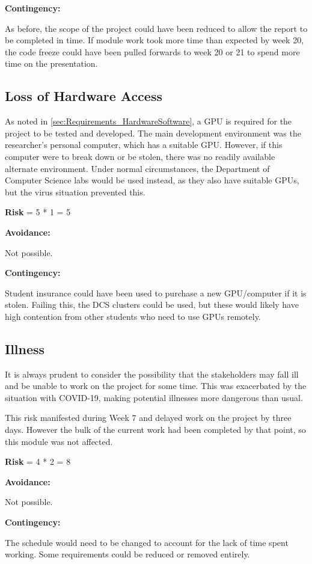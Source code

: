 \textbf{Contingency:}

\hspace{20pt}As before, the scope of the project could have been reduced to allow the report to be completed in time.
If module work took more time than expected by week 20, the code freeze could have been pulled forwards to week 20 or 21 to spend more time on the presentation.


\subsection{Loss of Hardware Access}
As noted in \cref{sec:Requirements_HardwareSoftware}, a GPU is required for the project to be tested and developed.
The main development environment was the researcher's personal computer, which has a suitable GPU.
However, if this computer were to break down or be stolen, there was no readily available alternate environment.
Under normal circumstances, the Department of Computer Science labs would be used instead, as they also have suitable GPUs, but the virus situation prevented this.

\textbf{Risk} = 5 * 1 = 5

\textbf{Avoidance:}

\hspace{20pt}Not possible.

\textbf{Contingency:}

\hspace{20pt}Student insurance could have been used to purchase a new GPU/computer if it is stolen.
Failing this, the DCS clusters could be used, but these would likely have high contention from other students who need to use GPUs remotely.

\subsection{Illness}
It is always prudent to consider the possibility that the stakeholders may fall ill and be unable to work on the project for some time.
This was exacerbated by the situation with COVID-19, making potential illnesses more dangerous than usual.

This risk manifested during Week 7 and delayed work on the project by three days.
However the bulk of the current work had been completed by that point, so this module was not affected.%

\textbf{Risk} = 4 * 2 = 8

\textbf{Avoidance:}

\hspace{20pt}Not possible.

\textbf{Contingency:}

\hspace{20pt}The schedule would need to be changed to account for the lack of time spent working.
Some requirements could be reduced or removed entirely.

